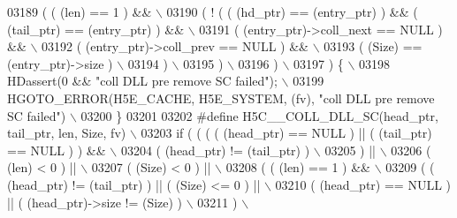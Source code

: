 \begin{DoxyCode}
03189 \textcolor{preprocessor}{     ( ( (len) == 1 ) &&                                                       \(\backslash\)}
03190 \textcolor{preprocessor}{       ( ! ( ( (hd\_ptr) == (entry\_ptr) ) && ( (tail\_ptr) == (entry\_ptr) ) &&   \(\backslash\)}
03191 \textcolor{preprocessor}{             ( (entry\_ptr)->coll\_next == NULL ) &&                             \(\backslash\)}
03192 \textcolor{preprocessor}{             ( (entry\_ptr)->coll\_prev == NULL ) &&                             \(\backslash\)}
03193 \textcolor{preprocessor}{             ( (Size) == (entry\_ptr)->size )                                   \(\backslash\)}
03194 \textcolor{preprocessor}{           )                                                                   \(\backslash\)}
03195 \textcolor{preprocessor}{       )                                                                       \(\backslash\)}
03196 \textcolor{preprocessor}{     )                                                                         \(\backslash\)}
03197 \textcolor{preprocessor}{   ) \{                                                                         \(\backslash\)}
03198 \textcolor{preprocessor}{    HDassert(0 && "coll DLL pre remove SC failed");                            \(\backslash\)}
03199 \textcolor{preprocessor}{    HGOTO\_ERROR(H5E\_CACHE, H5E\_SYSTEM, (fv), "coll DLL pre remove SC failed")  \(\backslash\)}
03200 \textcolor{preprocessor}{\}}
03201 
03202 \textcolor{preprocessor}{#define H5C\_\_COLL\_DLL\_SC(head\_ptr, tail\_ptr, len, Size, fv)                 \(\backslash\)}
03203 \textcolor{preprocessor}{if ( ( ( ( (head\_ptr) == NULL ) || ( (tail\_ptr) == NULL ) ) &&              \(\backslash\)}
03204 \textcolor{preprocessor}{       ( (head\_ptr) != (tail\_ptr) )                                         \(\backslash\)}
03205 \textcolor{preprocessor}{     ) ||                                                                   \(\backslash\)}
03206 \textcolor{preprocessor}{     ( (len) < 0 ) ||                                                       \(\backslash\)}
03207 \textcolor{preprocessor}{     ( (Size) < 0 ) ||                                                      \(\backslash\)}
03208 \textcolor{preprocessor}{     ( ( (len) == 1 ) &&                                                    \(\backslash\)}
03209 \textcolor{preprocessor}{       ( ( (head\_ptr) != (tail\_ptr) ) || ( (Size) <= 0 ) ||                 \(\backslash\)}
03210 \textcolor{preprocessor}{         ( (head\_ptr) == NULL ) || ( (head\_ptr)->size != (Size) )           \(\backslash\)}
03211 \textcolor{preprocessor}{       )                                                                    \(\backslash\)}

\end{DoxyCode}
